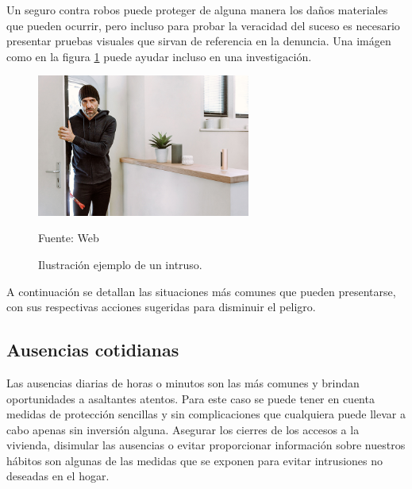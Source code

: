 Un seguro contra robos puede proteger de alguna manera los daños materiales que pueden ocurrir, pero incluso para probar la veracidad del suceso es necesario presentar pruebas visuales que sirvan de referencia en la denuncia. Una imágen como en la figura \ref{fig:intruso} puede ayudar incluso en una investigación.\\

\begin{figure}[H]
    \begin{center}
        \includegraphics[width=7cm]{img/capitulo_3/intruso.jpg}
    \end{center}
    \begin{center}
        \caption{Ilustración ejemplo de un intruso.}
        Fuente: Web
        \label{fig:intruso}
    \end{center}
\end{figure}

A continuación se detallan las situaciones más comunes que pueden presentarse, con sus respectivas acciones sugeridas para disminuir el peligro.\\

\subsection{Ausencias cotidianas}
Las ausencias diarias de horas o minutos son las más comunes y brindan oportunidades a asaltantes atentos. Para este caso se puede tener en cuenta medidas de protección sencillas y sin complicaciones que cualquiera puede llevar a cabo apenas sin inversión alguna. Asegurar los cierres de los accesos a la vivienda, disimular las ausencias o evitar proporcionar información sobre nuestros hábitos son algunas de las medidas que se exponen para evitar intrusiones no deseadas en el hogar.\\
 

